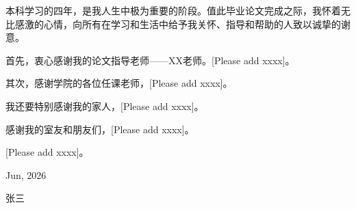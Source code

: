 \documentclass[UTF8,twoside,AutoFakeBold=1,AutoFakeSlant,zihao=-4]{HZAU}
\begin{document}
\setlength{\parskip}{0em}
\setlength{\parindent}{2\ccwd}

 \clearpage

 \clearpage

 \clearpage

 \clearpage

 \clearpage

\printbibliography


\acknowledgement

本科学习的四年，是我人生中极为重要的阶段。值此毕业论文完成之际，我怀着无比感激的心情，向所有在学习和生活中给予我关怀、指导和帮助的人致以诚挚的谢意。

首先，衷心感谢我的论文指导老师——XX老师。[Please add xxxx]。

其次，感谢学院的各位任课老师，[Please add xxxx]。

我还要特别感谢我的家人，[Please add xxxx]。

感谢我的室友和朋友们，[Please add xxxx]。


[Please add xxxx]。


\hfill Jun, 2026

\hfill 张三
\end{document}

